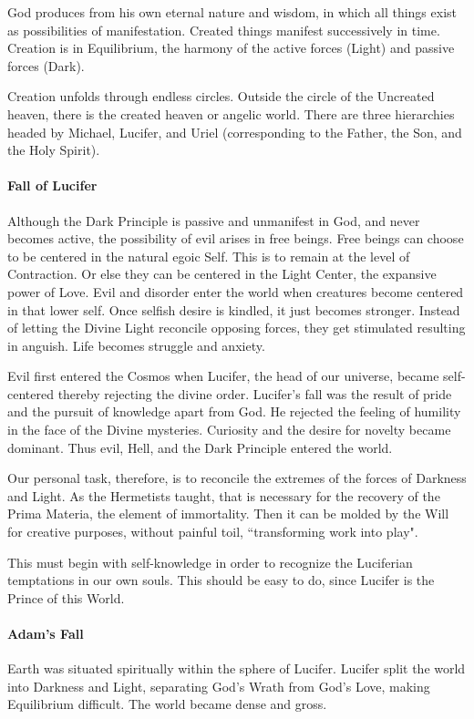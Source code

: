 God produces from his own eternal nature and wisdom, in which all things exist as possibilities of manifestation. Created things manifest successively in time. Creation is in Equilibrium, the harmony of the active forces (Light) and passive forces (Dark).

Creation unfolds through endless circles. Outside the circle of the Uncreated heaven, there is the created heaven or angelic world. There are three hierarchies headed by Michael, Lucifer, and Uriel (corresponding to the Father, the Son, and the Holy Spirit).

\paragraph{Fall of Lucifer}
Although the Dark Principle is passive and unmanifest in God, and never becomes active, the possibility of evil arises in free beings. Free beings can choose to be centered in the natural egoic Self. This is to remain at the level of Contraction. Or else they can be centered in the Light Center, the expansive power of Love. Evil and disorder enter the world when creatures become centered in that lower self. Once selfish desire is kindled, it just becomes stronger. Instead of letting the Divine Light reconcile opposing forces, they get stimulated resulting in anguish. Life becomes struggle and anxiety.

Evil first entered the Cosmos when Lucifer, the head of our universe, became self-centered thereby rejecting the divine order. Lucifer's fall was the result of pride and the pursuit of knowledge apart from God. He rejected the feeling of humility in the face of the Divine mysteries. Curiosity and the desire for novelty became dominant. Thus evil, Hell, and the Dark Principle entered the world.

Our personal task, therefore, is to reconcile the extremes of the forces of Darkness and Light. As the Hermetists taught, that is necessary for the recovery of the Prima Materia, the element of immortality. Then it can be molded by the Will for creative purposes, without painful toil, ``transforming work into play".

This must begin with self-knowledge in order to recognize the Luciferian temptations in our own souls. This should be easy to do, since Lucifer is the Prince of this World.

\paragraph{Adam's Fall}
Earth was situated spiritually within the sphere of Lucifer. Lucifer split the world into Darkness and Light, separating God's Wrath from God's Love, making Equilibrium difficult. The world became dense and gross.

